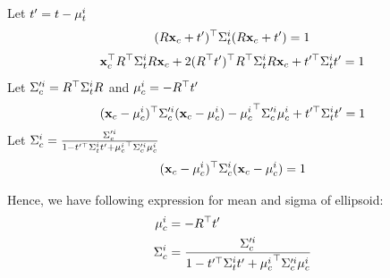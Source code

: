 \documentclass[10pt,twocolumn,letterpaper]{article}
\begin{document}
\newcommand{\tcmut}{t'}
Let $\tcmut = \tctot - \muit$
\begin{align}
  (\Rctot \xc + \tcmut)^\top \Sigmait (\Rctot \xc + \tcmut) = 1
\end{align}
\begin{align}
  \xc^\top \Rctot^\top \Sigmait \Rctot \xc + 2 (\Rctot^\top \tcmut)^\top  \Rctot^\top\Sigmait \Rctot \xc
  + \tcmut^\top \Sigmait \tcmut = 1
\end{align}
\newcommand{\Sigmaic}{\Sigma'^i_c}
\newcommand{\muic}{{\mu^i_c}}
Let $\Sigmaic = \Rctot^\top \Sigmait \Rctot$ and $\muic = - \Rctot^\top
\tcmut$
\begin{align}
  (\xc - \muic)^\top\Sigmaic(\xc - \muic) - \muic^\top\Sigmaic\muic +
  \tcmut^\top \Sigmait \tcmut = 1
\end{align}
\newcommand{\Sigmaicf}{\Sigma^i_c}
Let $\Sigmaicf = \frac{\Sigmaic}{1 - \tcmut^\top \Sigmait \tcmut +
\muic^\top\Sigmaic\muic}$
\begin{align}
(\xc - \muic)^\top\Sigmaicf(\xc - \muic) = 1
\end{align}

Hence, we have following expression for mean and sigma of ellipsoid:
\begin{align}
  \label{eq:ellipsoidMeanSigma}
  \muic &= - \Rctot^\top \tcmut \\
  \Sigmaicf &= \frac{\Sigmaic}
{1 - \tcmut^\top \Sigmait \tcmut + \muic^\top\Sigmaic\muic}
\end{align}


\end{document}
